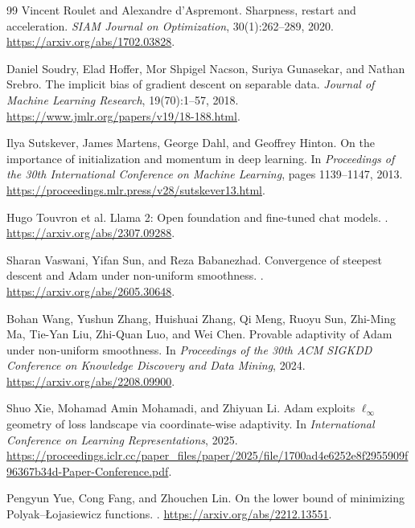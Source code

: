 \documentclass[11pt,twoside]{article}
\theoremstyle{definition}
\theoremstyle{remark}
\begin{document}
\begin{thebibliography}{99}
Vincent Roulet and Alexandre d'Aspremont.
\newblock Sharpness, restart and acceleration.
\newblock \emph{SIAM Journal on Optimization}, 30(1):262--289, 2020.
\newblock \url{https://arxiv.org/abs/1702.03828}.

Daniel Soudry, Elad Hoffer, Mor Shpigel Nacson, Suriya Gunasekar, and Nathan
Srebro.
\newblock The implicit bias of gradient descent on separable data.
\newblock \emph{Journal of Machine Learning Research}, 19(70):1--57, 2018.
\newblock \url{https://www.jmlr.org/papers/v19/18-188.html}.

Ilya Sutskever, James Martens, George Dahl, and Geoffrey Hinton.
\newblock On the importance of initialization and momentum in deep learning.
\newblock In \emph{Proceedings of the 30th International Conference on
Machine Learning}, pages 1139--1147, 2013.
\newblock \url{https://proceedings.mlr.press/v28/sutskever13.html}.

Hugo Touvron et al.
\newblock Llama 2: Open foundation and fine-tuned chat models.
.
\newblock \url{https://arxiv.org/abs/2307.09288}.

Sharan Vaswani, Yifan Sun, and Reza Babanezhad.
\newblock Convergence of steepest descent and Adam under non-uniform
smoothness.
.
\newblock \url{https://arxiv.org/abs/2605.30648}.

Bohan Wang, Yushun Zhang, Huishuai Zhang, Qi Meng, Ruoyu Sun, Zhi-Ming Ma,
Tie-Yan Liu, Zhi-Quan Luo, and Wei Chen.
\newblock Provable adaptivity of Adam under non-uniform smoothness.
\newblock In \emph{Proceedings of the 30th ACM SIGKDD Conference on Knowledge
Discovery and Data Mining}, 2024.
\newblock \url{https://arxiv.org/abs/2208.09900}.

Shuo Xie, Mohamad Amin Mohamadi, and Zhiyuan Li.
\newblock Adam exploits $\ell_\infty$ geometry of loss landscape via
coordinate-wise adaptivity.
\newblock In \emph{International Conference on Learning Representations},
2025.
\newblock \url{https://proceedings.iclr.cc/paper_files/paper/2025/file/1700ad4e6252e8f2955909f96367b34d-Paper-Conference.pdf}.

Pengyun Yue, Cong Fang, and Zhouchen Lin.
\newblock On the lower bound of minimizing Polyak--\L{}ojasiewicz functions.
.
\newblock \url{https://arxiv.org/abs/2212.13551}.


\end{thebibliography}
\end{document}

